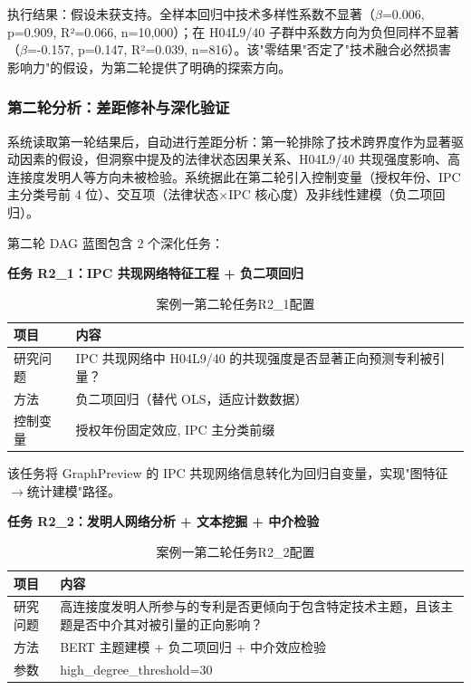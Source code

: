 执行结果：假设未获支持。全样本回归中技术多样性系数不显著（$\beta$=0.006, p=0.909, R²=0.066, n=10,000）；在 H04L9/40 子群中系数方向为负但同样不显著（$\beta$=-0.157, p=0.147, R²=0.039, n=816）。该"零结果"否定了"技术融合必然损害影响力"的假设，为第二轮提供了明确的探索方向。

\subsubsection{第二轮分析：差距修补与深化验证}

系统读取第一轮结果后，自动进行差距分析：第一轮排除了技术跨界度作为显著驱动因素的假设，但洞察中提及的法律状态因果关系、H04L9/40 共现强度影响、高连接度发明人等方向未被检验。系统据此在第二轮引入控制变量（授权年份、IPC 主分类号前 4 位）、交互项（法律状态×IPC 核心度）及非线性建模（负二项回归）。

第二轮 DAG 蓝图包含 2 个深化任务：

\textbf{任务 R2\_1：IPC 共现网络特征工程 + 负二项回归}


\begin{table}[htbp]
\centering
\caption{案例一第二轮任务R2\_1配置}
\label{tab:case1-r2-t1}
\begin{tabular}{>{\centering\arraybackslash}p{3.2cm} >{\raggedright\arraybackslash}p{10.4cm}}
\toprule %
项目 & 内容 \\
\midrule %
研究问题 & IPC 共现网络中 H04L9/40 的共现强度是否显著正向预测专利被引量？ \\ \addlinespace[0.5ex]
方法     & 负二项回归（替代 OLS，适应计数数据） \\ \addlinespace[0.5ex]
控制变量 & 授权年份固定效应, IPC 主分类前缀 \\
\bottomrule %
\end{tabular}
\end{table}

该任务将 GraphPreview 的 IPC 共现网络信息转化为回归自变量，实现"图特征$\rightarrow$统计建模"路径。

\textbf{任务 R2\_2：发明人网络分析 + 文本挖掘 + 中介检验}


\begin{table}[htbp]
\centering
\caption{案例一第二轮任务R2\_2配置}
\label{tab:case1-r2-t2}
\begin{tabular}{>{\centering\arraybackslash}p{3.2cm} >{\raggedright\arraybackslash}p{10.4cm}}
\toprule %
项目 & 内容 \\
\midrule %
研究问题 & 高连接度发明人所参与的专利是否更倾向于包含特定技术主题，且该主题是否中介其对被引量的正向影响？ \\ \addlinespace[0.5ex]
方法     & BERT 主题建模 + 负二项回归 + 中介效应检验 \\ \addlinespace[0.5ex]
参数     & high\_degree\_threshold=30 \\
\bottomrule %
\end{tabular}
\end{table}

